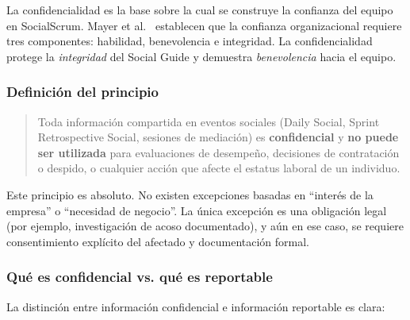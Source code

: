 La confidencialidad es la base sobre la cual se construye la confianza del equipo en SocialScrum. Mayer et al.\ \cite{mayer1995integrative} establecen que la confianza organizacional requiere tres componentes: habilidad, benevolencia e integridad. La confidencialidad protege la \textit{integridad} del Social Guide y demuestra \textit{benevolencia} hacia el equipo.

\subsubsection{Definición del principio}

\begin{quote}
    Toda información compartida en eventos sociales (Daily Social, Sprint Retrospective Social, sesiones de mediación) es \textbf{confidencial} y \textbf{no puede ser utilizada} para evaluaciones de desempeño, decisiones de contratación o despido, o cualquier acción que afecte el estatus laboral de un individuo.
\end{quote}

Este principio es absoluto. No existen excepciones basadas en ``interés de la empresa'' o ``necesidad de negocio''. La única excepción es una obligación legal (por ejemplo, investigación de acoso documentado), y aún en ese caso, se requiere consentimiento explícito del afectado y documentación formal.

\subsubsection{Qué es confidencial vs. qué es reportable}

La distinción entre información confidencial e información reportable es clara:

